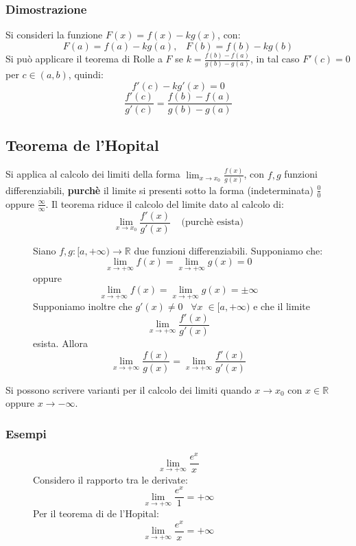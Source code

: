 \documentclass[a4paper]{article}
\theoremstyle{break}
\theoremstyle{break}
\theoremstyle{break}
\theoremstyle{break}
\begin{document}
\subsubsection{Dimostrazione}
Si consideri la funzione \( F(x) = f(x) - kg(x) \), con:
\[
  F(a) = f(a) -kg(a),\;\;\; F(b) = f(b) - kg(b)
\] 
Si può applicare il teorema di Rolle a \( F \) se \( k = \frac{f(b) - f(a)}{g(b) - g(a)} \), in tal caso
\( F'(c) = 0 \) per \( c \in (a,b) \), quindi:
\[
f'(c) - kg'(x) = 0
\] 
\[
\frac{f'(c)}{g'(c)} = \frac{f(b) - f(a)}{g(b) - g(a)}
\] 

\subsection{Teorema de l'Hopital}
Si applica al calcolo dei limiti della forma \( \lim_{x \to x_0} \frac{f(x)}{g(x)} \), con \( f,g \) 
funzioni differenziabili, \textbf{purchè} il limite si presenti sotto la forma (indeterminata)
\( \frac{0}{0} \) oppure \( \frac{\infty}{\infty} \). Il teorema riduce il calcolo del limite
dato al calcolo di:
\[
  \lim_{x \to x_0} \frac{f'(x)}{g'(x)} \;\;\;\; \text{(purchè esista)}
\] 

\begin{figure}[H]
  \begin{definition}
    Siano \( f,g: [a,+\infty) \to \mathbb{R} \) due funzioni differenziabili. Supponiamo che:
    \[
      \lim_{x \to +\infty} f(x) = \lim_{x \to +\infty} g(x) = 0
    \] 
    oppure
    \[
      \lim_{x \to +\infty} f(x) = \lim_{x \to +\infty} g(x) = \pm \infty
    \] 
    Supponiamo inoltre che \( g'(x) \neq 0\;\;\; \forall x\; \in  [a,+\infty)  \) e che il
    limite
    \[
      \lim_{x \to +\infty} \frac{f'(x)}{g'(x)} 
    \] 
    esista. Allora
    \[ \lim_{x \to +\infty} \frac{f(x)}{g(x)} = \lim_{x \to +\infty} \frac{f'(x)}{g'(x)}  \]
  \end{definition}
\end{figure}
Si possono scrivere varianti per il calcolo dei limiti quando \( x \to x_0 \) con \( x \in \mathbb{R} \) 
oppure \( x \to -\infty \).

\subsubsection{Esempi}
\begin{figure}[H]
  \begin{example}
    \[
      \lim_{x \to +\infty} \frac{e^x}{x}
    \] 
    Considero il rapporto tra le derivate:
    \[
      \lim_{x \to +\infty} \frac{e^x}{1} = +\infty
    \] 
    Per il teorema di de l'Hopital:
    \[
      \lim_{x \to +\infty} \frac{e^x}{x} = +\infty
    \] 
  \end{example}
\end{figure}
\end{document}
